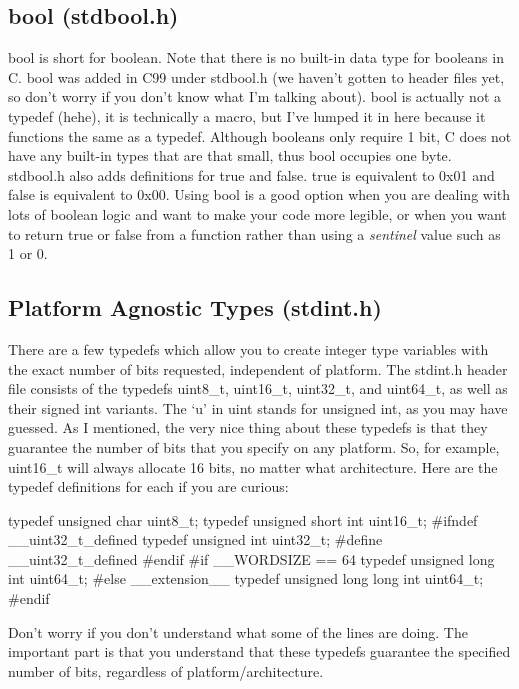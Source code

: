 \documentclass{article}
\begin{document}
\subsection{bool (stdbool.h)}

bool is short for boolean. Note that there is no built-in data type for booleans in C. bool was added in C99
under stdbool.h (we haven’t gotten to header files yet, so don’t worry if you don’t know what I’m talking
about). bool is actually not a typedef (hehe), it is technically a macro, but I've lumped it in here because it
functions the same as a typedef. Although booleans only require 1 bit, C does not have any built-in types that
are that small, thus bool occupies one byte. stdbool.h also adds definitions for true and false. true is
equivalent to 0x01 and false is equivalent to 0x00. Using bool is a good option when you are dealing with lots
of boolean logic and want to make your code more legible, or when you want to return true or false from a
function rather than using a \textit{sentinel} value such as 1 or 0.

\subsection{Platform Agnostic Types (stdint.h)}

There are a few typedefs which allow you to create integer type variables with the exact number of bits
requested, independent of platform. The stdint.h header file consists of the typedefs uint8\_t, uint16\_t,
uint32\_t, and uint64\_t, as well as their signed int variants. The ‘u’ in uint stands for unsigned int, as you
may have guessed. As I mentioned, the very nice thing about these typedefs is that they guarantee the number
of bits that you specify on any platform. So, for example, uint16\_t will always allocate 16 bits, no matter
what architecture. Here are the typedef definitions for each if you are curious:

\begin{clst}
typedef unsigned char uint8_t;
typedef unsigned short int uint16_t;
#ifndef __uint32_t_defined
typedef unsigned int uint32_t;
#define __uint32_t_defined
#endif
#if __WORDSIZE == 64
typedef unsigned long int uint64_t;
#else
__extension__
typedef unsigned long long int uint64_t;
#endif
\end{clst}

Don’t worry if you don’t understand what some of the lines are doing. The important part is that you
understand that these typedefs guarantee the specified number of bits, regardless of platform/architecture.
\end{document}
